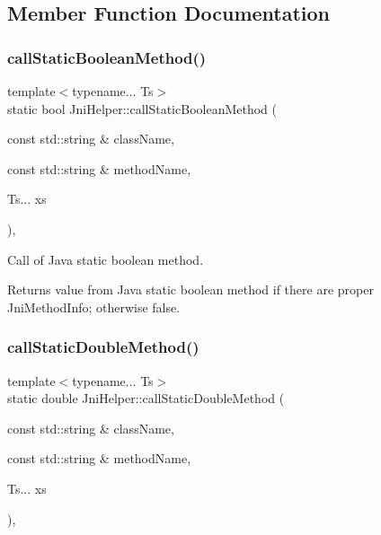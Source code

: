 \subsection{Member Function Documentation}
\mbox{\label{classJniHelper_abe141f8f565c0852058f9c08952b5eac}} 
\subsubsection{\texorpdfstring{call\+Static\+Boolean\+Method()}{callStaticBooleanMethod()}}
{\footnotesize\ttfamily template$<$typename... Ts$>$ \\
static bool Jni\+Helper\+::call\+Static\+Boolean\+Method (\begin{DoxyParamCaption}\item[{const std\+::string \&}]{class\+Name,  }\item[{const std\+::string \&}]{method\+Name,  }\item[{Ts...}]{xs }\end{DoxyParamCaption})\hspace{0.3cm}{\ttfamily [inline]}, {\ttfamily [static]}}



Call of Java static boolean method. 

\begin{DoxyReturn}{Returns}
value from Java static boolean method if there are proper Jni\+Method\+Info; otherwise false. 
\end{DoxyReturn}
\mbox{\label{classJniHelper_a1a1bfc8c89a94a3ca24c2752f2123283}} 
\subsubsection{\texorpdfstring{call\+Static\+Double\+Method()}{callStaticDoubleMethod()}}
{\footnotesize\ttfamily template$<$typename... Ts$>$ \\
static double Jni\+Helper\+::call\+Static\+Double\+Method (\begin{DoxyParamCaption}\item[{const std\+::string \&}]{class\+Name,  }\item[{const std\+::string \&}]{method\+Name,  }\item[{Ts...}]{xs }\end{DoxyParamCaption})\hspace{0.3cm}{\ttfamily [inline]}, {\ttfamily [static]}}



